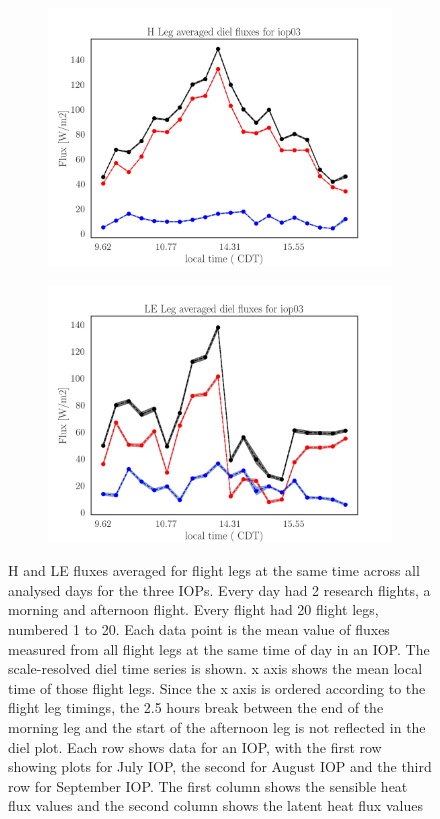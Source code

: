\documentclass[draft]{agujournal2019}
\begin{document}
\begin{figure}[hbtp]
 \medskip
 \begin{subfigure}{0.49\textwidth}
     \includegraphics[width=\textwidth]{H_IOP03_diel.png}
     \label{fig:H_IOP03_diel}
 \end{subfigure}
 \hfill
 \begin{subfigure}{0.49\textwidth}
     \includegraphics[width=\textwidth]{LE_IOP03_diel.png}
     \label{fig:LE_IOP03_diel}
 \end{subfigure}
\caption{H and LE fluxes averaged for flight legs at the same time across all analysed days for the three IOPs. Every day had 2 research flights, a morning and afternoon flight. Every flight had 20 flight legs, numbered 1 to 20. Each data point is the mean value of fluxes measured from all flight legs at the same time of day in an IOP. The scale-resolved diel time series is shown. x axis shows the mean local time of those flight legs. Since the x axis is ordered according to the flight leg timings, the 2.5 hours break between the end of the morning leg and the start of the afternoon leg is not reflected in the diel plot. Each row shows data for an IOP, with the first row showing plots for July IOP, the second for August IOP and the third row for September IOP. The first column shows the sensible heat flux values and the second column shows the latent heat flux values }
\label{fig:IOP_diel}
\end{figure}
\end{document}
